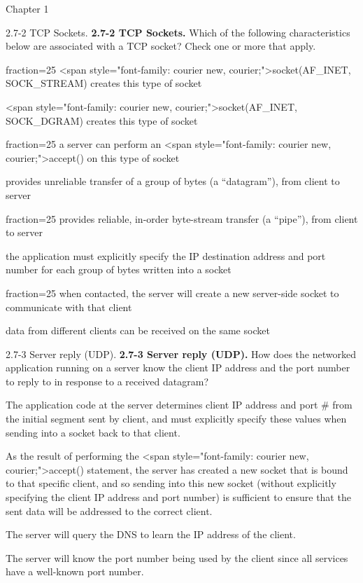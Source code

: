 \documentclass[a4paper]{article}
\begin{document}
\begin{quiz}{Chapter 1}
\begin{multi}[points=1,shuffle,multiple]{2.7-2 TCP Sockets.}
\textbf{2.7-2 TCP Sockets.} Which of the following characteristics below are associated with a TCP socket? Check one or more that apply. 
\item[fraction=25] <span style="font-family: courier new, courier;">socket(AF_INET, SOCK_STREAM) creates this type of socket
\item <span style="font-family: courier new, courier;">socket(AF_INET, SOCK_DGRAM) creates this type of socket
\item[fraction=25] a server can perform an <span style="font-family: courier new, courier;">accept() on this type of socket
\item provides unreliable transfer of a group of bytes (a “datagram”), from client to server
\item[fraction=25] provides reliable, in-order byte-stream transfer (a “pipe”), from client to server
\item the application must explicitly specify the IP destination address and port number for each group of bytes written into a socket
\item[fraction=25] when contacted, the server will create a new server-side socket to communicate with that client
\item data from different clients can be received on the same socket
\end{multi}

\begin{multi}[points=1,shuffle]{2.7-3 Server reply (UDP).}
\textbf{2.7-3 Server reply (UDP).} How does the networked application running on a server know the client IP address and the port number to reply to in response to a received datagram?
\item* The  application code at the server determines client IP address and port \# from the initial segment sent by client, and must explicitly specify these values when sending into a socket back to that client.
\item As the result of performing the <span style="font-family: courier new, courier;">accept() statement, the server has created a new socket that is bound to that specific client, and so sending into this new socket (without explicitly specifying the client IP address and port number) is sufficient to ensure that the sent data will be addressed to the correct client.
\item The server will query the DNS to learn the IP address of the client.
\item The server will know the port number being used by the client since all services have a well-known port number.
\end{multi}


\end{quiz}
\end{document}
